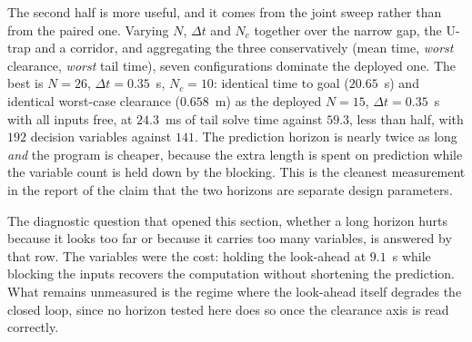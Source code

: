 \documentclass[11pt,a4paper]{article}
\newcommand{\Ninput}{N_c}
\begin{document}
The second half is more useful, and it comes from the joint sweep rather than from the paired one. Varying
$N$, $\Delta t$ and $\Ninput$ together over the narrow gap, the U-trap and a corridor, and aggregating the
three conservatively (mean time, \emph{worst} clearance, \emph{worst} tail time), seven configurations
dominate the deployed one. The best is $N=26$, $\Delta t=0.35$~s, $\Ninput=10$: identical time to goal
($20.65$~s) and identical worst-case clearance ($0.658$~m) as the deployed $N=15$, $\Delta t=0.35$~s with all
inputs free, at $24.3$~ms of tail solve time against $59.3$, less than half, with $192$ decision variables
against $141$. The prediction horizon is nearly twice as long \emph{and} the program is cheaper, because the
extra length is spent on prediction while the variable count is held down by the blocking. This is the
cleanest measurement in the report of the claim that the two horizons are separate design parameters.


The diagnostic question that opened this section, whether a long horizon hurts because it looks too far or
because it carries too many variables, is answered by that row. The variables were the cost: holding the
look-ahead at $9.1$~s while blocking the inputs recovers the computation without shortening the prediction.
What remains unmeasured is the regime where the look-ahead itself degrades the closed loop, since no horizon
tested here does so once the clearance axis is read correctly.
\end{document}

